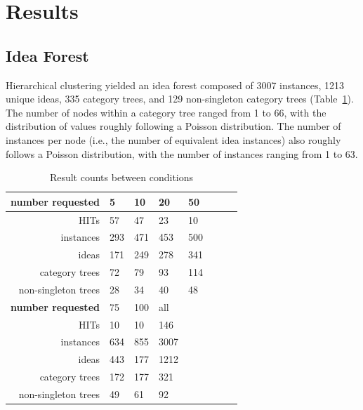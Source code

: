 \section{Results}

\subsection{Idea Forest}

Hierarchical clustering yielded an idea forest composed of 3007 instances, 1213 unique ideas, 335 category trees, and 129 non-singleton category trees (Table~\ref{tab:idea_forest}). The number of nodes within a category tree ranged from 1 to 66, with the distribution of values roughly following a Poisson distribution. The number of instances per node (i.e., the number of equivalent idea instances) also roughly follows a Poisson distribution, with the number of instances ranging from 1 to 63.
\begin{table}
	\begin{tabular}[h!]{r | l l l l l l l}
	\textbf{number requested} & 5 & 10 & 20 & 50 \\ \hline \hline
	HITs & 57 & 47 & 23 & 10\\
	instances & 293 & 471 & 453 & 500 \\
	ideas & 171 & 249 & 278 & 341 \\
	category trees & 72 & 79 & 93 & 114 \\
	non-singleton trees & 28 & 34 & 40 & 48 \\ \hline \hline
	\textbf{number requested} & 75 & 100 & all \\ \hline \hline
    HITs & 10 & 10 & 146\\
	instances & 634 & 855 & 3007\\
	ideas & 443 & 177 &1212\\
	category trees & 172 & 177 &321\\
	non-singleton trees & 49 & 61 &92\\ 
	\end{tabular}
    \caption{Result counts between conditions}
    \label{tab:idea_forest}
\end{table}


